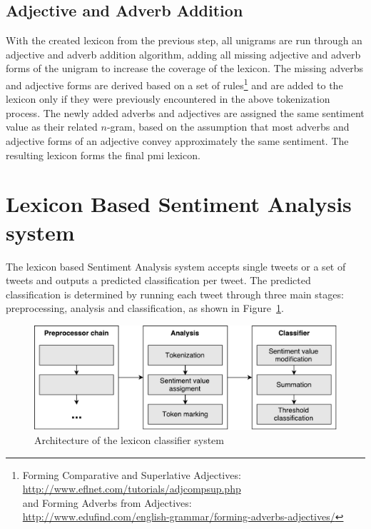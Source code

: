 \subsection*{Adjective and Adverb Addition}
With the created lexicon from the previous step, all unigrams are run through an adjective and adverb addition algorithm, adding all missing adjective and adverb forms of the unigram to increase the coverage of the lexicon. The missing adverbs and adjective forms are derived based on a set of rules\footnote{Forming Comparative and Superlative Adjectives:\\ \url{http://www.eflnet.com/tutorials/adjcompsup.php} \\and Forming Adverbs from Adjectives:\\ \url{http://www.edufind.com/english-grammar/forming-adverbs-adjectives/}} and are added to the lexicon only if they were previously encountered in the above tokenization process. The newly added adverbs and adjectives are assigned the same sentiment value as their related $n$-gram, based on the assumption that most adverbs and adjective forms of an adjective convey approximately the same sentiment. The resulting lexicon forms the final \ac{pmi} lexicon.

\section{Lexicon Based Sentiment Analysis system}
\label{sec:lexicon_based_sentiment_analysis_system}
The lexicon based Sentiment Analysis system accepts single tweets or a set of tweets and outputs a predicted classification per tweet. The predicted classification is determined by running each tweet through three main stages: preprocessing, analysis and classification, as shown in Figure~\ref{fig:classifier_overview}.

\begin{figure}[t]
    \centering
    \includegraphics[width=\textwidth]{./figs/classifier_overview}
    \caption{Architecture of the lexicon classifier system}
    \label{fig:classifier_overview}
\end{figure}

